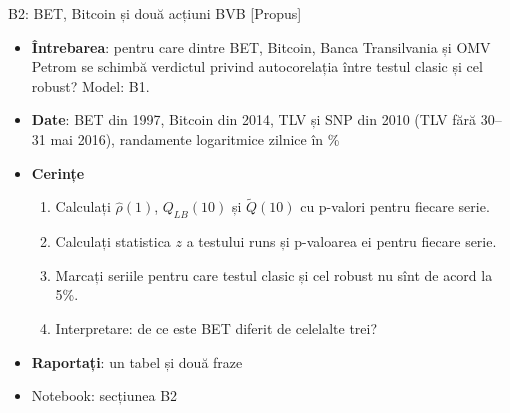 \begin{frame}{B2: BET, Bitcoin și două acțiuni BVB [Propus]}
\itemsize{\footnotesize}
\begin{itemize}
\item \textbf{Întrebarea}: pentru care dintre BET, Bitcoin, Banca Transilvania și OMV Petrom se schimbă verdictul privind autocorelația între testul clasic și cel robust? Model: B1.
\item \textbf{Date}: BET din 1997, Bitcoin din 2014, TLV și SNP din 2010 (TLV fără 30--31 mai 2016), randamente logaritmice zilnice în \%
\item \textbf{Cerințe}
\begin{enumerate}
    \item Calculați $\hat\rho(1)$, $Q_{LB}(10)$ și $\tilde Q(10)$ cu p-valori pentru fiecare serie.
    \item Calculați statistica $z$ a testului runs și p-valoarea ei pentru fiecare serie.
    \item Marcați seriile pentru care testul clasic și cel robust nu sînt de acord la 5\%.
    \item Interpretare: de ce este BET diferit de celelalte trei?
\end{enumerate}
\item \textbf{Raportați}: un tabel și două fraze
\item Notebook: secțiunea B2
\end{itemize}
\end{frame}

